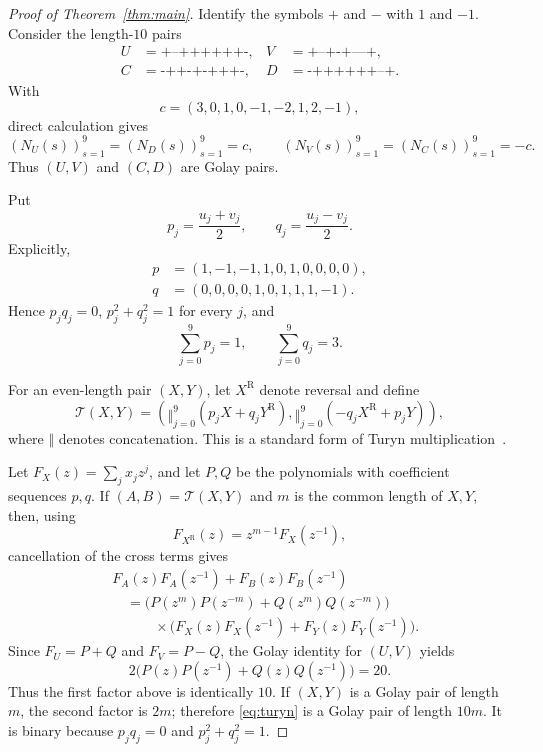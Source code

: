 \documentclass[11pt]{amsart}
\newcommand{\rev}{\mathrm{R}}
\begin{document}
\begin{proof}[Proof of Theorem~\ref{thm:main}]
Identify the symbols $+$ and $-$ with $1$ and $-1$. Consider the
length-$10$ pairs
\[
\begin{aligned}
U&=\texttt{+--++++++-}, &
V&=\texttt{+--+-+---+},\\
C&=\texttt{-++-+-+++-}, &
D&=\texttt{-++++++--+}.
\end{aligned}
\]
With
\[
c=(3,0,1,0,-1,-2,1,2,-1),
\]
direct calculation gives
\[
(N_U(s))_{s=1}^{9}=(N_D(s))_{s=1}^{9}=c,
\qquad
(N_V(s))_{s=1}^{9}=(N_C(s))_{s=1}^{9}=-c.
\]
Thus $(U,V)$ and $(C,D)$ are Golay pairs.

Put
\[
p_j=\frac{u_j+v_j}{2},
\qquad
q_j=\frac{u_j-v_j}{2}.
\]
Explicitly,
\[
\begin{aligned}
p&=(1,-1,-1,1,0,1,0,0,0,0),\\
q&=(0,0,0,0,1,0,1,1,1,-1).
\end{aligned}
\]
Hence $p_jq_j=0$, $p_j^2+q_j^2=1$ for every $j$, and
\begin{equation}\label{eq:sums}
\sum_{j=0}^{9}p_j=1,
\qquad
\sum_{j=0}^{9}q_j=3.
\end{equation}

For an even-length pair $(X,Y)$, let $X^{\rev}$ denote reversal and
define
\begin{equation}\label{eq:turyn}
\mathcal T(X,Y)
=
\left(
\mathop{\Vert}_{j=0}^{9}(p_jX+q_jY^{\rev}),
\mathop{\Vert}_{j=0}^{9}(-q_jX^{\rev}+p_jY)
\right),
\end{equation}
where $\Vert$ denotes concatenation. This is a standard form of
Turyn multiplication~\cite{Turyn}.

Let $F_X(z)=\sum_jx_jz^j$, and let $P,Q$ be the polynomials with
coefficient sequences $p,q$. If $(A,B)=\mathcal T(X,Y)$ and $m$ is
the common length of $X,Y$, then, using
\[
F_{X^{\rev}}(z)=z^{m-1}F_X(z^{-1}),
\]
cancellation of the cross terms gives
\begin{align*}
&F_A(z)F_A(z^{-1})+F_B(z)F_B(z^{-1})\\
&\quad=
\bigl(P(z^m)P(z^{-m})+Q(z^m)Q(z^{-m})\bigr)\\
&\qquad\quad{}\times
\bigl(F_X(z)F_X(z^{-1})+F_Y(z)F_Y(z^{-1})\bigr).
\end{align*}
Since $F_U=P+Q$ and $F_V=P-Q$, the Golay identity for $(U,V)$ yields
\[
2\bigl(P(z)P(z^{-1})+Q(z)Q(z^{-1})\bigr)=20.
\]
Thus the first factor above is identically $10$. If $(X,Y)$ is a
Golay pair of length $m$, the second factor is $2m$; therefore
\eqref{eq:turyn} is a Golay pair of length $10m$. It is binary because
$p_jq_j=0$ and $p_j^2+q_j^2=1$.


\end{proof}
\end{document}
